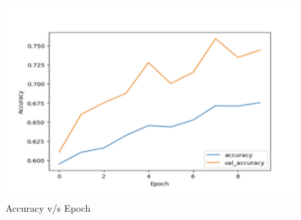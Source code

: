 \begin{figure}[h]
    \centering
    \includegraphics[width=1\textwidth]{figures/accuracy_epoch.png}
    \caption{Accuracy v/s Epoch}
    \label{fig:enter-label}
\end{figure}


























